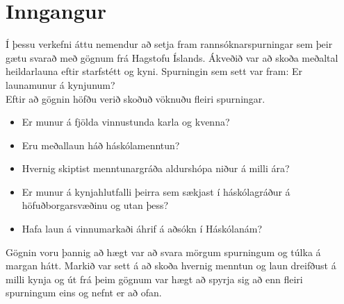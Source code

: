 \documentclass[12pt, git, final]{rureport}
\begin{document}
\maketitle  %



\section{Inngangur} %

Í þessu verkefni áttu nemendur að setja fram rannsóknarspurningar sem þeir gætu svarað með gögnum frá Hagstofu Íslands\cite{H}. 
Ákveðið var að skoða meðaltal heildarlauna eftir starfstétt og kyni.
Spurningin sem sett var fram: Er launamunur á kynjunum?
\\
Eftir að gögnin höfðu verið skoðuð vöknuðu fleiri spurningar.
\begin{itemize} 
	\item Er munur á fjölda vinnustunda karla og kvenna?
	\item Eru meðallaun háð háskólamenntun?
	\item Hvernig skiptist menntunargráða aldurshópa niður á milli ára?
	\item Er munur á kynjahlutfalli þeirra sem sækjast í háskólagráður á höfuðborgarsvæðinu og utan þess?
	\item Hafa laun á vinnumarkaði áhrif á aðsókn í Háskólanám?
\end{itemize}


Gögnin voru þannig að hægt var að svara mörgum spurningum og túlka á margan hátt. Markið var sett á að skoða hvernig menntun og laun dreifðust á milli kynja og út frá þeim gögnum var hægt að spyrja sig að enn fleiri spurningum eins og nefnt er að ofan.

\end{document}
